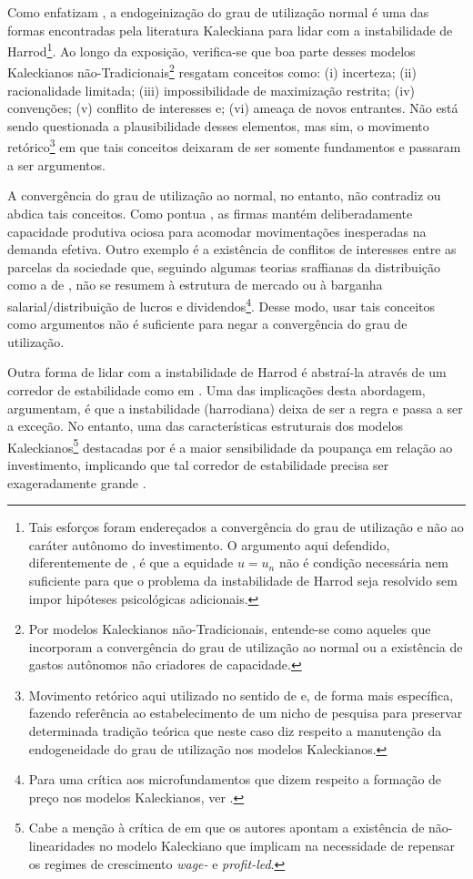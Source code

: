 Como enfatizam \textcite{hein_harrodian_2012}, a endogeinização do grau de utilização normal é uma das formas encontradas pela literatura Kaleckiana para lidar com a instabilidade de Harrod\footnote{Tais esforços foram endereçados a convergência do grau de utilização e não ao caráter autônomo do investimento. O argumento aqui defendido, diferentemente de \textcite{setterfield_long-run_2017}, é que a equidade $u = u_n$ não é condição necessária nem suficiente para que o problema da instabilidade de Harrod seja resolvido sem impor hipóteses psicológicas adicionais.}. Ao longo da exposição, verifica-se que boa parte desses modelos Kaleckianos não-Tradicionais\footnote{Por modelos Kaleckianos não-Tradicionais, entende-se como aqueles que incorporam a convergência do grau de utilização ao normal ou a existência de gastos autônomos não criadores de capacidade.} resgatam conceitos como: (i) incerteza; (ii) racionalidade limitada; (iii) impossibilidade de maximização restrita; (iv) convenções; (v) conflito de interesses e; (vi) ameaça de novos entrantes. Não está sendo questionada a plausibilidade desses elementos, mas sim, o movimento retórico\footnote{Movimento retórico aqui utilizado no sentido de \textcite{swales_aspects_2011} e, de forma mais específica, fazendo referência ao estabelecimento de um nicho de pesquisa para preservar determinada tradição teórica que neste caso diz respeito a manutenção da endogeneidade do grau de utilização nos modelos Kaleckianos.} em que tais conceitos deixaram de ser somente fundamentos e passaram a ser argumentos. 

A convergência do grau de utilização ao normal, no entanto, não contradiz ou abdica tais conceitos. Como pontua \textcite{steindl_maturity_1952}, as firmas mantém deliberadamente capacidade produtiva ociosa para acomodar movimentações inesperadas na demanda efetiva. Outro exemplo é a existência de conflitos de interesses entre as parcelas da sociedade que, seguindo algumas teorias sraffianas da distribuição como a de \textcite{pivetti_essay_1992}, não se resumem à estrutura de mercado ou à barganha salarial/distribuição de lucros e dividendos\footnote{Para uma crítica aos microfundamentos que dizem respeito a formação de preço nos modelos Kaleckianos, ver \textcite{steedman_questions_1992}.}. Desse modo, usar tais conceitos como argumentos não é suficiente para negar a convergência do grau de utilização.


Outra forma de lidar com a instabilidade de Harrod é abstraí-la através de um corredor de estabilidade como em \textcites{dutt_growth_1990}{setterfield_long-run_2017}. Uma das implicações desta abordagem, argumentam, é que a instabilidade (harrodiana) deixa de ser a regra e passa a ser a exceção. No entanto, uma das características estruturais dos modelos Kaleckianos\footnote{Cabe a menção à crítica de \textcite{nikiforos_distribution_2012} em que os autores apontam a existência de não-linearidades no modelo Kaleckiano que implicam na necessidade de repensar os regimes de crescimento \textit{wage-} e \textit{profit-led}.} destacadas por \textcite{skott_theoretical_2012} é a maior  sensibilidade da poupança em relação ao investimento, implicando que tal corredor de estabilidade precisa ser exageradamente grande \cite[p.~6]{girardi_normal_2018}.

